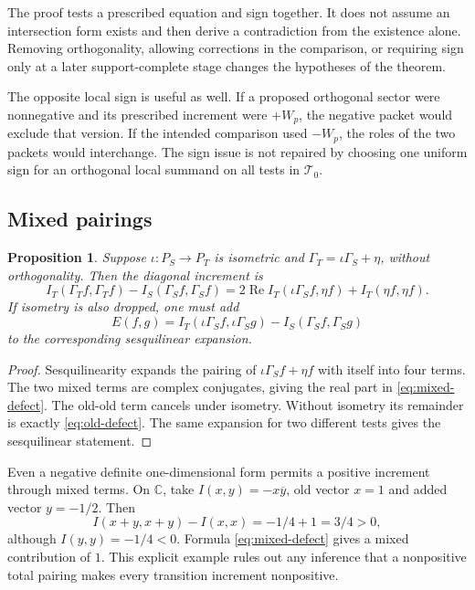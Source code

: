 \documentclass[11pt,letterpaper]{article}
\newtheorem{proposition}[theorem]{Proposition}
\theoremstyle{definition}
\theoremstyle{remark}
\newcommand{\C}{\mathbb C}
\newcommand{\T}{\mathcal T}
\begin{document}
The proof tests a prescribed equation and sign together.
It does not assume an intersection form exists and then
derive a contradiction from the existence alone. Removing
orthogonality, allowing corrections in the comparison, or
requiring sign only at a later support-complete stage changes
the hypotheses of the theorem.

The opposite local sign is useful as well. If a proposed
orthogonal sector were nonnegative and its prescribed
increment were $+W_p$, the negative packet would exclude
that version. If the intended comparison used $-W_p$, the
roles of the two packets would interchange. The sign issue
is not repaired by choosing one uniform sign for an
orthogonal local summand on all tests in $\T_0$.

\subsection{Mixed pairings}

\begin{proposition}
\label{prop:polarization-obstructions:mixed}
Suppose $\iota:P_S\to P_T$ is isometric and
$\Gamma_T=\iota\Gamma_S+\eta$, without orthogonality.
Then the diagonal increment is
\begin{equation}
 I_T(\Gamma_Tf,\Gamma_Tf)-I_S(\Gamma_Sf,\Gamma_Sf)
 =2\operatorname{Re}I_T(\iota\Gamma_Sf,\eta f)
 +I_T(\eta f,\eta f).
 \label{eq:mixed-defect}
\end{equation}
If isometry is also dropped, one must add
\begin{equation}
 E(f,g)=I_T(\iota\Gamma_Sf,\iota\Gamma_Sg)
       -I_S(\Gamma_Sf,\Gamma_Sg)
 \label{eq:old-defect}
\end{equation}
to the corresponding sesquilinear expansion.
\end{proposition}
\begin{proof}
Sesquilinearity expands the pairing of
$\iota\Gamma_Sf+\eta f$ with itself into four terms.
The two mixed terms are complex conjugates, giving the real
part in \eqref{eq:mixed-defect}. The old-old term cancels
under isometry. Without isometry its remainder is exactly
\eqref{eq:old-defect}. The same expansion for two different
tests gives the sesquilinear statement.
\end{proof}

Even a negative definite one-dimensional form permits a
positive increment through mixed terms. On $\C$, take
$I(x,y)=-x\overline y$, old vector $x=1$ and added vector
$y=-1/2$. Then
\[
 I(x+y,x+y)-I(x,x)=-1/4+1=3/4>0,
\]
although $I(y,y)=-1/4<0$. Formula
\eqref{eq:mixed-defect} gives a mixed contribution of $1$.
This explicit example rules out any inference that a
nonpositive total pairing makes every transition increment
nonpositive.
\end{document}
